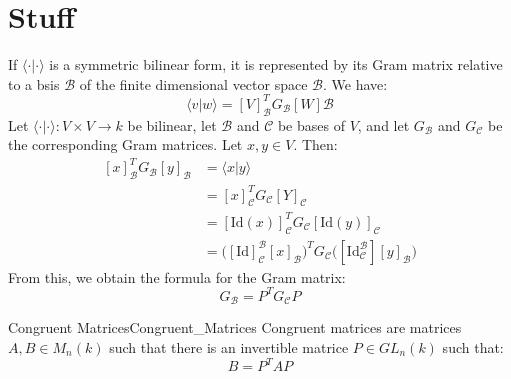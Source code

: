 \documentclass{article}                                                        %
\begin{document}
    \section{Stuff}
        If $\langle\cdot|\cdot\rangle$ is a symmetric bilinear form, it is
        represented by its Gram matrix relative to a bsis $\mathscr{B}$ of the
        finite dimensional vector space $\mathscr{B}$. We have:
        \begin{equation}
            \langle{v}|w\rangle
            =[V]_{\mathscr{B}}^{T}G_{\mathscr{B}}[W]\mathscr{B}
        \end{equation}
        Let $\langle\cdot|\cdot\rangle:V\times{V}\rightarrow{k}$ be bilinear,
        let $\mathscr{B}$ and $\mathscr{C}$ be bases of $V$, and let
        $G_{\mathscr{B}}$ and $G_{\mathscr{C}}$ be the corresponding Gram
        matrices. Let $x,y\in{V}$. Then:
        \begin{subequations}
            \begin{align}
                [x]_{\mathscr{B}}^{T}G_{\mathscr{B}}[y]_{\mathscr{B}}
                &=\langle{x}|y\rangle\\
                &=[x]_{\mathscr{C}}^{T}G_{\mathscr{C}}[Y]_{\mathscr{C}}\\
                &=[\textrm{Id}(x)]_{\mathscr{C}}^{T}G_{\mathscr{C}}
                    [\textrm{Id}(y)]_{\mathscr{C}}\\
                &=\Big([\textrm{Id}]_{\mathscr{C}}^{\mathscr{B}}
                    [x]_{\mathscr{B}}\Big)^{T}G_{\mathscr{C}}
                    \Big([\textrm{Id}_{\mathscr{C}}^{\mathscr{B}}]
                        [y]_{\mathscr{B}}\Big)
            \end{align}
        \end{subequations}
        From this, we obtain the formula for the Gram matrix:
        \begin{equation}
            G_{\mathscr{B}}=P^{T}G_{\mathscr{C}}P
        \end{equation}
        \begin{fdefinition}{Congruent Matrices}{Congruent_Matrices}
            Congruent matrices are matrices $A,B\in{M}_{n}(k)$ such that there
            is an invertible matrice $P\in{GL}_{n}(k)$ such that:
            \begin{equation}
                B=P^{T}AP
            \end{equation}
        \end{fdefinition}
\end{document}
